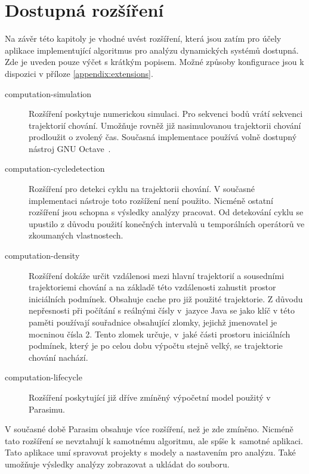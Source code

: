 \section{Dostupná rozšíření}

Na závěr této kapitoly je vhodné uvést rozšíření, která jsou zatím pro účely aplikace
implementující algoritmus pro analýzu dynamických systémů dostupná. Zde je uveden pouze výčet
s krátkým popisem. Možné způsoby konfigurace jsou k dispozici v příloze \ref{appendix:extensions}.

\begin{description}

	\item[computation-simulation] 		Rozšíření poskytuje numerickou simulaci. Pro se\-kven\-ci bodů vrátí
										sekvenci trajektorií chování. Umožňuje rovněž již nasimulovanou trajektorii
										chování prodloužit o zvolený čas. Současná implementace používá volně dostupný
										nástroj GNU Octave~\cite{eaton2008}. 

    \item[computation-cycledetection]	Rozšíření pro detekci cyklu na trajektorii cho\-vá\-ní. V současné
										implementaci nástroje toto rozšížení není použito. Nicméně ostatní
										rozšíření jsou schopna s výsledky analýzy pracovat. Od detekování
										cyklu se upustilo z důvodu použití konečných intervalů u
										temporálních operátorů ve zkoumaných vlastnostech.

    \item[computation-density]			Rozšíření dokáže určit vzdálenosi mezi hlavní trajektorií a sousedními trajektoriemi chování a na
										základě této vzdá\-le\-nos\-ti zahustit prostor iniciálních podmínek. Obsahuje cache pro
										již použité trajektorie. Z důvodu nepřesnosti při počítání s reálnými čísly v~jazyce Java
										se jako klíč v této paměti používají souřadnice obsahující zlomky, jejichž jmenovatel
										je mocninou čísla 2. Tento zlomek určuje, v~jaké části prostoru iniciálních podmínek,
										který je po celou dobu výpočtu stejně velký, se trajektorie chování nachází.

	\item[computation-lifecycle]		Rozšíření poskytující již dříve zmíněný výpočetní model použitý v Parasimu. 

\end{description}

V současné době Parasim obsahuje více rozšíření, než je zde zmíněno. Nicméně tato rozšíření se nevztahují k samotnému
algoritmu, ale spíše k~samotné aplikaci. Tato aplikace umí spravovat projekty s modely a nastavením
pro analýzu. Také umožňuje výsledky analýzy zobrazovat a ukládat do souboru.
